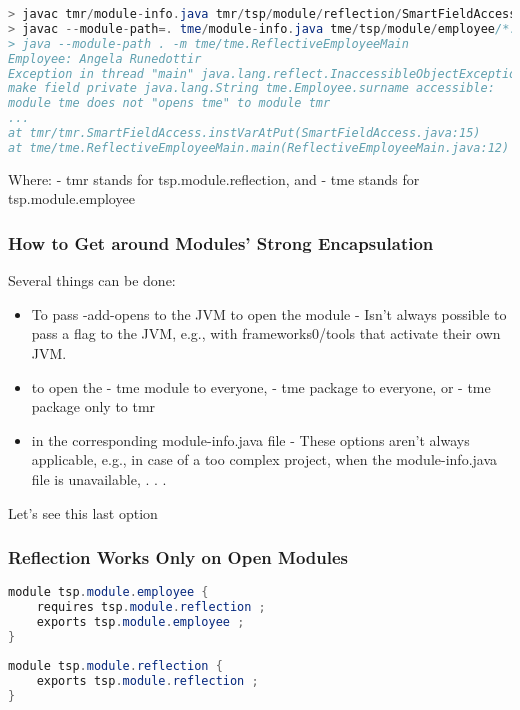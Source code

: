 \begin{lstlisting}[language=Java]
> javac tmr/module-info.java tmr/tsp/module/reflection/SmartFieldAccess.java
> javac --module-path=. tme/module-info.java tme/tsp/module/employee/*.java
> java --module-path . -m tme/tme.ReflectiveEmployeeMain
Employee: Angela Runedottir
Exception in thread "main" java.lang.reflect.InaccessibleObjectException: Unable to
make field private java.lang.String tme.Employee.surname accessible:
module tme does not "opens tme" to module tmr
...
at tmr/tmr.SmartFieldAccess.instVarAtPut(SmartFieldAccess.java:15)
at tme/tme.ReflectiveEmployeeMain.main(ReflectiveEmployeeMain.java:12)
\end{lstlisting}

Where:
- tmr stands for tsp.module.reflection, and
- tme stands for tsp.module.employee

\subsubsection{How to Get around Modules' Strong Encapsulation}

Several things can be done:

\begin{itemize}
	\item To pass -add-opens to the JVM to open the module
	- Isn’t always possible to pass a flag to the JVM, e.g., with frameworks0/tools that activate their own JVM.
	\item to open the
	- tme module to everyone,
	- tme package to everyone, or
	- tme package only to tmr
	\item in the corresponding module-info.java file
	- These options aren’t always applicable, e.g., in case of a too complex
project, when the module-info.java file is unavailable, . . .
\end{itemize}

Let’s see this last option

\subsubsection{Reflection Works Only on Open Modules}

\begin{lstlisting}[language=Java]
module tsp.module.employee {
	requires tsp.module.reflection ;
	exports tsp.module.employee ;
}
\end{lstlisting}

\begin{lstlisting}[language=Java]
module tsp.module.reflection {
	exports tsp.module.reflection ;
}
\end{lstlisting}

